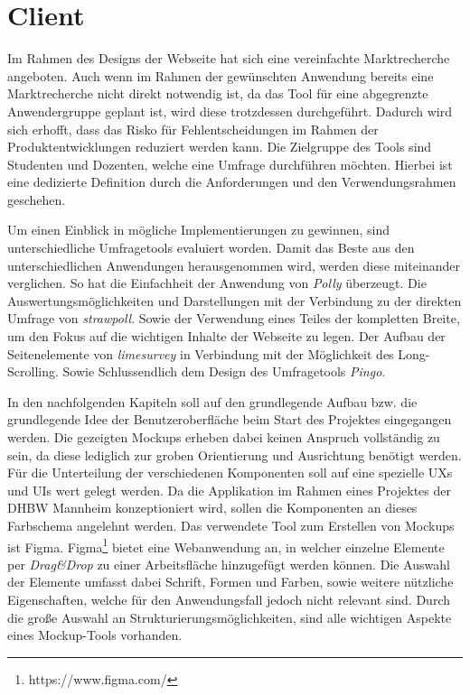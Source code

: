 \section{Client}
\label{sec:ClientKonzept}

Im Rahmen des Designs der Webseite hat sich eine vereinfachte Marktrecherche angeboten. 
Auch wenn im Rahmen der gewünschten Anwendung bereits eine Marktrecherche nicht direkt notwendig ist, da das Tool für eine abgegrenzte Anwendergruppe geplant ist, wird diese trotzdessen durchgeführt. 
Dadurch wird sich erhofft, dass das Risko für Fehlentscheidungen im Rahmen der Produktentwicklungen reduziert werden kann.\autocite{Pioch2019}
Die Zielgruppe des Tools sind Studenten und Dozenten, welche eine Umfrage durchführen möchten. 
Hierbei ist eine dedizierte Definition durch die Anforderungen und den Verwendungsrahmen geschehen. 

Um einen Einblick in mögliche Implementierungen zu gewinnen, sind unterschiedliche Umfragetools evaluiert worden. 
Damit das Beste aus den unterschiedlichen Anwendungen herausgenommen wird, werden diese miteinander verglichen.
So hat die Einfachheit der Anwendung von \emph{Polly} überzeugt.
Die Auswertungsmöglichkeiten und Darstellungen mit der Verbindung zu der direkten Umfrage von \emph{strawpoll}. 
Sowie der Verwendung eines Teiles der kompletten Breite, um den Fokus auf die wichtigen Inhalte der Webseite zu legen. 
Der Aufbau der Seitenelemente von \emph{limesurvey} in Verbindung mit der Möglichkeit des Long-Scrolling.
Sowie Schlussendlich dem Design des Umfragetools \emph{Pingo}.  

In den nachfolgenden Kapiteln soll auf den grundlegende Aufbau bzw. die grundlegende Idee der Benutzeroberfläche beim Start des Projektes eingegangen werden. 
Die gezeigten Mockups erheben dabei keinen Anspruch vollständig zu sein, da diese lediglich zur groben Orientierung und Ausrichtung benötigt werden.
Für die Unterteilung der verschiedenen Komponenten soll auf eine spezielle \acfp{UX} und \acfp{UI} wert gelegt werden. 
Da die Applikation im Rahmen eines Projektes der DHBW Mannheim konzeptioniert wird, sollen die Komponenten an dieses Farbschema angelehnt werden. 
Das verwendete Tool zum Erstellen von Mockups ist Figma.
Figma\footnote{https://www.figma.com/} bietet eine Webanwendung an, in welcher einzelne Elemente per \emph{Drag\&Drop} zu einer Arbeitsfläche hinzugefügt werden können.
Die Auswahl der Elemente umfasst dabei Schrift, Formen und Farben, sowie weitere nützliche Eigenschaften, welche für den Anwendungsfall jedoch nicht relevant sind.
Durch die große Auswahl an Strukturierungsmöglichkeiten, sind alle wichtigen Aspekte eines Mockup-Tools vorhanden.

